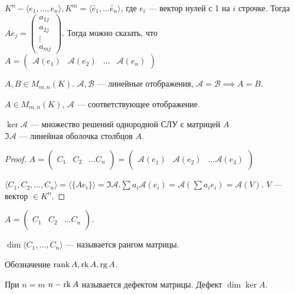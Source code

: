 $K^n - \langle e_1, \ldots, e_n \rangle, K^m = \langle \widetilde{e_1}, \ldots \widetilde{e_n} \rangle$, где $e_i$ --- вектор нулей с 1 на  $i$ строчке. Тогда 
$A e_j = \begin{pmatrix} a_{1j} \\ a_{2j} \\ \vdots \\ a_{mj} \end{pmatrix}$. 
Тогда можно сказать, что $A = \left(\begin{array}{c|c|c|c} \mathcal{A}(e_1) & \mathcal{A}(e_2) & \ldots & \mathcal{A}(e_n) \end{array} \right)$ 

\begin{consequence}
    $A, B \in M_{m, n}(K)$.  $\mathcal{A}, \mathcal{B}$ --- линейные отображения,  $\mathcal{A} = \mathcal{B} \implies A = B$.
\end{consequence}
\begin{statement}
    $A \in M_{m, n}(K)$,  $\mathcal{A}$ --- соответствующее отображение.

    $\ker \mathcal{A}$ --- множество решений однородной СЛУ с матрицей  $A$\\
    $\Im \mathcal{A}$ --- линейная оболочка столбцов $A$.
\end{statement}
\begin{proof}
    $A = \left( \begin{array}{c|c|c} & &  \\ C_1 & C_2 & \ldots C_n \\ & & \end{array} \right) = \left(\begin{array}{c|c|c} & &  \\ \mathcal{A}(e_1) & \mathcal{A}(e_2) & \ldots \mathcal{A}(e_3) \\ & & \end{array} \right)$ 

    $\langle C_1, C_2, \ldots, C_n \rangle = \langle \{A e_i \} \rangle = \Im \mathcal{A}. \sum a_i \mathcal{A}(e_i) = \mathcal{A}(\sum a_i e_i) = \mathcal{A}(V)$. $V$ --- вектор  $\in K^n$.
\end{proof}
\begin{definition}
    $A = \left( \begin{array}{c|c|c} & &  \\ C_1 & C_2 & \ldots C_n \\ & & \end{array} \right)$.

    $\dim \langle C_1, \ldots, C_n \rangle$ --- называется рангом матрицы.

    Обозначение $\operatorname{rank} A, \operatorname{rk} A, \operatorname{rg} A$.
    
    При $n=m$  $n-\operatorname{rk} A$ называется  дефектом матрицы. Дефект $\dim \ker A$.
\end{definition}
